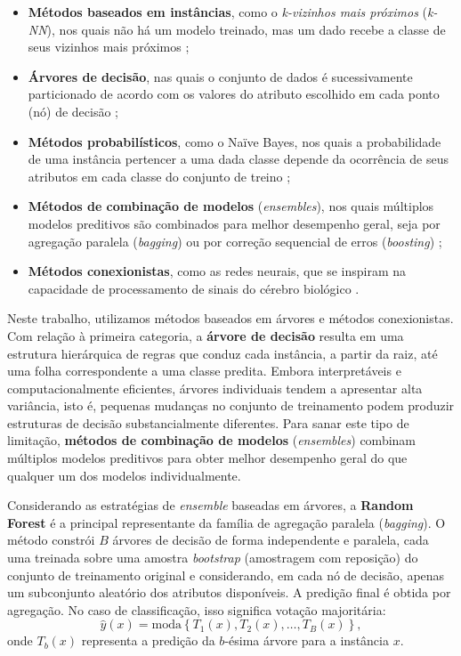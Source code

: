 \begin{itemize}
    \item \textbf{Métodos baseados em instâncias}, como o \textit{k-vizinhos mais próximos} (\textit{k-NN}), nos quais não há um modelo treinado, mas um dado recebe a classe de seus vizinhos mais próximos \cite{cover1967nearest};
    \item \textbf{Árvores de decisão}, nas quais o conjunto de dados é sucessivamente particionado de acordo com os valores do atributo escolhido em cada ponto (nó) de decisão \cite{quinlan1986induction};
    \item \textbf{Métodos probabilísticos}, como o Naïve Bayes, nos quais a probabilidade de uma instância pertencer a uma dada classe depende da ocorrência de seus atributos em cada classe do conjunto de treino \cite{langley1992analysis};
    \item \textbf{Métodos de combinação de modelos} (\textit{ensembles}), nos quais múltiplos modelos preditivos são combinados para melhor desempenho geral, seja por agregação paralela (\textit{bagging}) \cite{breiman1996bagging} ou por correção sequencial de erros (\textit{boosting}) \cite{freund1997decision};
    \item \textbf{Métodos conexionistas}, como as redes neurais, que se inspiram na capacidade de processamento de sinais do cérebro biológico \cite{mcculloch1943logical}.
\end{itemize}

Neste trabalho, utilizamos métodos baseados em árvores e métodos conexionistas. Com relação à primeira categoria, a \textbf{árvore de decisão} resulta em uma estrutura hierárquica de regras que conduz cada instância, a partir da raiz, até uma folha correspondente a uma classe predita. Embora interpretáveis e computacionalmente eficientes, árvores individuais tendem a apresentar alta variância, isto é, pequenas mudanças no conjunto de treinamento podem produzir estruturas de decisão substancialmente diferentes. Para sanar este tipo de limitação, \textbf{métodos de combinação de modelos} (\textit{ensembles}) combinam múltiplos modelos preditivos para obter melhor desempenho geral do que qualquer um dos modelos individualmente.

Considerando as estratégias de \textit{ensemble} baseadas em árvores, a \textbf{Random Forest} \cite{breiman2001random} é a principal representante da família de agregação paralela (\textit{bagging}). O método constrói $B$ árvores de decisão de forma independente e paralela, cada uma treinada sobre uma amostra \textit{bootstrap} (amostragem com reposição) do conjunto de treinamento original e considerando, em cada nó de decisão, apenas um subconjunto aleatório dos atributos disponíveis. A predição final é obtida por agregação. No caso de classificação, isso significa votação majoritária:
\begin{equation}
\hat{y}(x) = \text{moda}\left\{T_1(x), T_2(x), \ldots, T_B(x)\right\},
\end{equation}
onde $T_b(x)$ representa a predição da $b$-ésima árvore para a instância $x$.


